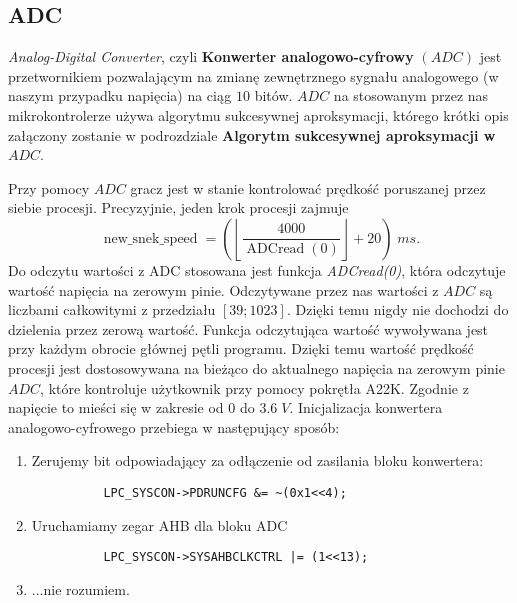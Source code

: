 \documentclass[a4paper,12pt,twoside]{article}
\theoremstyle{plain}
\theoremstyle{definition}
\theoremstyle{remark}
\begin{document}
\subsection{ADC}
\textit{Analog-Digital Converter}, czyli
\textbf{Konwerter analogowo-cyfrowy} $(ADC)$ jest przetwornikiem pozwalającym na zmianę zewnętrznego sygnału analogowego (w naszym przypadku napięcia) na ciąg $10$ bitów. $ADC$ na stosowanym przez nas mikrokontrolerze używa algorytmu sukcesywnej aproksymacji, którego krótki opis załączony zostanie w podrozdziale \textbf{Algorytm sukcesywnej aproksymacji w $ADC$}.

Przy pomocy $ADC$ gracz jest w stanie kontrolować prędkość poruszanej przez siebie procesji. Precyzyjnie, jeden krok procesji zajmuje
\[
\operatorname{new\_snek\_speed} =\left( \left\lfloor \frac{4000}{ \operatorname{ADCread}(0)} \right\rfloor + 20 \right) \; ms.
\]
Do odczytu wartości z ADC stosowana jest funkcja \textit{ADCread(0)}, która odczytuje wartość napięcia na zerowym pinie.
Odczytywane przez nas wartości z $ADC$ są liczbami całkowitymi z przedziału $[39;1023]$. Dzięki temu nigdy nie dochodzi do dzielenia przez zerową wartość. Funkcja odczytująca wartość wywoływana jest przy każdym obrocie głównej pętli programu. Dzięki temu wartość prędkość procesji jest dostosowywana na bieżąco do aktualnego napięcia na zerowym pinie $ADC$, które kontroluje użytkownik przy pomocy pokrętła A22K. Zgodnie z \cite{INST} napięcie to mieści się w zakresie od $0$ do $3.6 \;V$. 
Inicjalizacja konwertera analogowo-cyfrowego przebiega w następujący sposób:
\begin{enumerate}
	\item Zerujemy bit odpowiadający za odłączenie od zasilania bloku konwertera:
		\begin{verbatim}
		  LPC_SYSCON->PDRUNCFG &= ~(0x1<<4);
		\end{verbatim}
	\item Uruchamiamy zegar AHB dla bloku ADC
		\begin{verbatim}
		  LPC_SYSCON->SYSAHBCLKCTRL |= (1<<13);
		\end{verbatim}
	\item ...nie rozumiem.
\end{enumerate}
\end{document}
